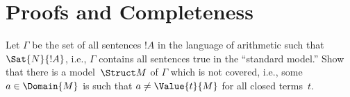 
\part{Proofs and Completeness}


\begin{prob}
Let $\Gamma$ be the set of all sentences $!A$ in the language of
arithmetic such that $\Sat{N}{!A}$, i.e., $\Gamma$ contains all
sentences true in the ``standard model.'' Show that there is a
model~$\Struct M$ of $\Gamma$ which is not covered, i.e., some
$a \in \Domain{M}$ is such that $a \neq \Value{t}{M}$ for all
closed terms~$t$.
\end{prob}

